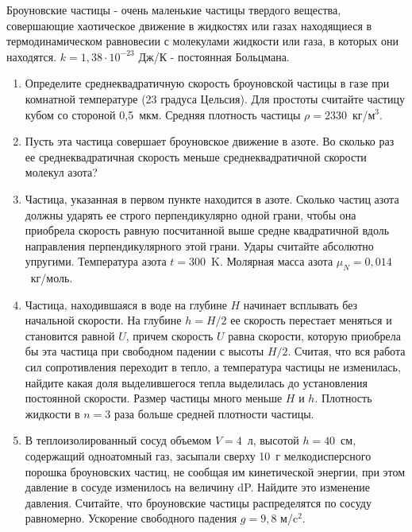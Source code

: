 
Броуновские частицы - очень маленькие частицы твердого вещества, совершающие хаотическое движение в 
жидкостях или газах находящиеся в термодинамическом равновесии с молекулами жидкости или газа, в которых 
они находятся. $k = 1,38 \cdot 10^{-23}$ Дж/К - постоянная Больцмана.

\begin{enumerate}
    \item Определите среднеквадратичную скорость броуновской частицы в газе при комнатной температуре 
    (23 градуса Цельсия). Для простоты считайте частицу кубом со стороной 0,5~мкм. 
    Средняя плотность частицы $\rho=2330$~кг/м$^3$.
    \item Пусть эта частица совершает броуновское движение в азоте. Во сколько раз ее среднеквадратичная 
    скорость меньше среднеквадратичной скорости молекул азота?
    \item Частица, указанная в первом пункте находится в азоте. Сколько частиц азота должны ударять ее 
    строго перпендикулярно одной грани, чтобы она приобрела скорость равную посчитанной выше средне 
    квадратичной вдоль направления перпендикулярного этой грани. Удары считайте абсолютно упругими. 
    Температура азота $t = 300$~K. Молярная масса азота $\mu_N= 0,014$~кг/моль.
    \item Частица, находившаяся в воде на глубине $H$ начинает всплывать без начальной скорости. На глубине 
    $h = H/2$ ее скорость перестает меняться и становится равной $U$, причем скорость $U$ равна скорости, 
    которую приобрела бы эта частица при свободном падении с высоты $H/2$. Считая, что вся работа сил 
    сопротивления переходит в тепло, а температура частицы не изменилась, найдите какая доля выделившегося 
    тепла выделилась до установления постоянной скорости. Размер частицы много меньше $H$ и $h$. Плотность 
    жидкости в $n=3$ раза больше средней плотности частицы.
    \item В теплоизолированный сосуд объемом $V = 4$~л, высотой $h = 40$~см, содержащий одноатомный газ, 
    засыпали сверху 10~г мелкодисперсного порошка броуновских частиц, не сообщая им кинетической энергии, 
    при этом давление в сосуде изменилось на величину dP. Найдите это изменение давления. Считайте, что 
    броуновские частицы распределятся по сосуду равномерно. Ускорение свободного падения $g =9,8$ м/c$^2$.
\end{enumerate}